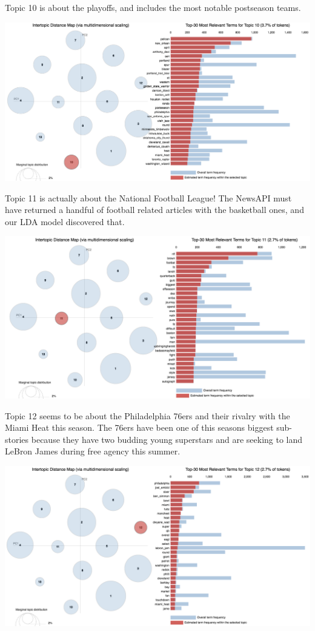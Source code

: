 \documentclass[11pt]{article}
\begin{document}
Topic 10 is about the playoffs, and includes the most notable postseason teams. 

\includegraphics[width=470pt]{10.png} 

Topic 11 is actually about the National Football League!  The NewsAPI must have returned a handful of football related articles with the basketball ones, and our LDA model discovered that. 

\includegraphics[width=470pt]{11.png} 

Topic 12 seems to be about the Philadelphia 76ers and their rivalry with the Miami Heat this season. The 76ers have been one of this seasons biggest sub-stories because they have two budding young superstars and are seeking to land LeBron James during free agency this summer.

\includegraphics[width=470pt]{12.png} 
\end{document}
